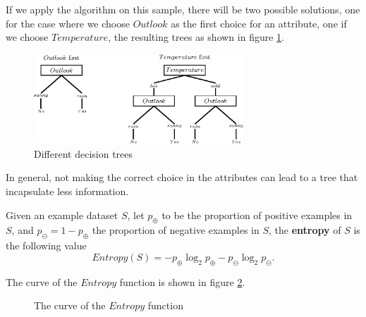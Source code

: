 \documentclass[10pt, letterpaper]{report}
\begin{document}
If we apply the algorithm on this sample, there will be two possible solutions, one for the case where we choose $Outlook$ as the first choice for an attribute, one if we choose $Temperature$, the resulting trees as shown in figure \ref{img:tennis_criteria}.

\begin{figure}[h!]
    \centering
    \includegraphics[width=0.7\textwidth]{images/tennis_criteria.eps}
    \caption{Different decision trees}
    \label{img:tennis_criteria}
\end{figure}

In general, not making the correct choice in the attributes can lead to a tree that incapsulate less information.  \begin{definition}
    Given an example dataset $S$, let $p_\oplus$ to be the proportion of positive examples in $S$, and $p_\ominus=1-p_\oplus$  the proportion of negative examples in $S$, the \textbf{entropy} of $S$ is the following value\begin{equation}
        Entropy(S)=-p_\oplus\log_2p_\oplus-p_\ominus\log_2p_\ominus.
    \end{equation}
\end{definition}
The curve of the $Entropy$ function is shown in figure \ref{fig:entropia_binaria}.
\begin{figure}[h!]
    \centering
    \caption{The curve of the $Entropy$ function}
    \label{fig:entropia_binaria}
\end{figure}
\end{document}
